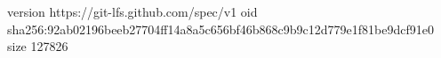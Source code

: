 version https://git-lfs.github.com/spec/v1
oid sha256:92ab02196beeb27704ff14a8a5c656bf46b868c9b9c12d779e1f81be9dcf91e0
size 127826
